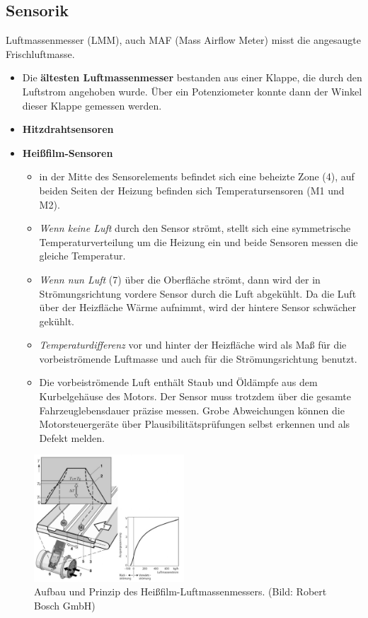 \newpage

\subsection{Sensorik}\label{sensorik}

Luftmassenmesser (LMM), auch MAF (Mass Airflow Meter) misst die
angesaugte Frischluftmasse.

\begin{itemize}
\item
  Die \textbf{ältesten Luftmassenmesser} bestanden aus einer Klappe, die
  durch den Luftstrom angehoben wurde. Über ein Potenziometer konnte
  dann der Winkel dieser Klappe gemessen werden.
\item
  \textbf{Hitzdrahtsensoren}
\item
  \textbf{Heißfilm-Sensoren}

  \begin{itemize}
  \item
    in der Mitte des Sensorelements befindet sich eine beheizte Zone
    (4), auf beiden Seiten der Heizung befinden sich Temperatursensoren
    (M1 und M2).
  \item
    \emph{Wenn keine Luft} durch den Sensor strömt, stellt sich eine
    symmetrische Temperaturverteilung um die Heizung ein und beide
    Sensoren messen die gleiche Temperatur.
  \item
    \emph{Wenn nun Luft} (7) über die Oberfläche strömt, dann wird der
    in Strömungsrichtung vordere Sensor durch die Luft abgekühlt. Da die
    Luft über der Heizfläche Wärme aufnimmt, wird der hintere Sensor
    schwächer gekühlt.
  \item
    \emph{Temperaturdifferenz} vor und hinter der Heizfläche wird als
    Maß für die vorbeiströmende Luftmasse und auch für die
    Strömungsrichtung benutzt.
  \item
    Die vorbeiströmende Luft enthält Staub und Öldämpfe aus dem
    Kurbelgehäuse des Motors. Der Sensor muss trotzdem über die gesamte
    Fahrzeuglebensdauer präzise messen. Grobe Abweichungen können die
    Motorsteuergeräte über Plausibilitätsprüfungen selbst erkennen und
    als Defekt melden.
  \end{itemize}
\end{itemize}

\begin{figure}[!ht]%
\centering
\includegraphics[width=0.5\textwidth]{images/EDC/EDC-11.pdf}
\caption{Aufbau und Prinzip des Heißfilm-Luftmassenmessers. (Bild:
Robert Bosch GmbH)}
\end{figure}

